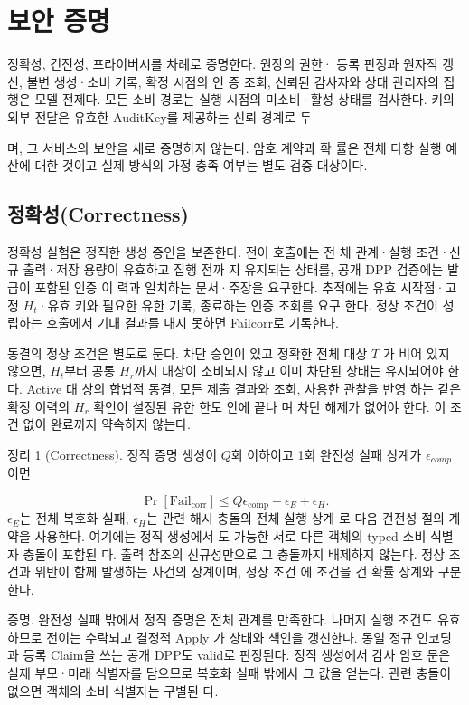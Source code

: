 \section{보안 증명}
정확성, 건전성, 프라이버시를 차례로 증명한다. 원장의 권한·
등록 판정과 원자적 갱신, 불변 생성·소비 기록, 확정 시점의 인
증 조회, 신뢰된 감사자와 상태 관리자의 집행은 모델 전제다.
모든 소비 경로는 실행 시점의 미소비·활성 상태를 검사한다.
키의 외부 전달은 유효한 AuditKey를 제공하는 신뢰 경계로 두

며, 그 서비스의 보안을 새로 증명하지 않는다. 암호 계약과 확
률은 전체 다항 실행 예산에 대한 것이고 실제 방식의 가정 충족
여부는 별도 검증 대상이다.

\subsection{정확성(Correctness)}
정확성 실험은 정직한 생성 증인을 보존한다. 전이 호출에는 전
체 관계·실행 조건·신규 출력·저장 용량이 유효하고 집행 전까
지 유지되는 상태를, 공개 DPP 검증에는 발급이 포함된 인증 이
력과 일치하는 문서·주장을 요구한다. 추적에는 유효 시작점·고
정 \(H_{t}\)·유효 키와 필요한 유한 기록, 종료하는 인증 조회를 요구
한다. 정상 조건이 성립하는 호출에서 기대 결과를 내지 못하면
Failcorr로 기록한다.

동결의 정상 조건은 별도로 둔다. 차단 승인이 있고 정확한
전체 대상 \(T\) 가 비어 있지 않으면, \(H_{t}\)부터 공통 \(H_{r}\)까지 대상이
소비되지 않고 이미 차단된 상태는 유지되어야 한다. Active 대
상의 합법적 동결, 모든 제출 결과와 조회, 사용한 관찰을 반영
하는 같은 확정 이력의 \(H_{r}\) 확인이 설정된 유한 한도 안에 끝나
며 차단 해제가 없어야 한다. 이 조건 없이 완료까지 약속하지
않는다.

정리 1 (Correctness). 정직 증명 생성이 \(Q\)회 이하이고 1회
완전성 실패 상계가 \(\epsilon _{comp}\)이면

\begin{equation}
    \Pr[\mathrm{Fail}_{\mathrm{corr}}]\le Q\epsilon_{\mathrm{comp}}+\epsilon_E+\epsilon_H.\tag{23}
\end{equation}
\(\epsilon _{E}\)는 전체 복호화 실패, \(\epsilon _{H}\)는 관련 해시 충돌의 전체 실행 상계
로 다음 건전성 절의 계약을 사용한다. 여기에는 정직 생성에서
도 가능한 서로 다른 객체의 typed 소비 식별자 충돌이 포함된
다. 출력 참조의 신규성만으로 그 충돌까지 배제하지 않는다.
정상 조건과 위반이 함께 발생하는 사건의 상계이며, 정상 조건
에 조건을 건 확률 상계와 구분한다.

증명. 완전성 실패 밖에서 정직 증명은 전체 관계를 만족한다.
나머지 실행 조건도 유효하므로 전이는 수락되고 결정적 Apply
가 상태와 색인을 갱신한다. 동일 정규 인코딩과 등록 Claim을
쓰는 공개 DPP도 valid로 판정된다. 정직 생성에서 감사 암호
문은 실제 부모·미래 식별자를 담으므로 복호화 실패 밖에서 그
값을 얻는다. 관련 충돌이 없으면 객체의 소비 식별자는 구별된
다.

